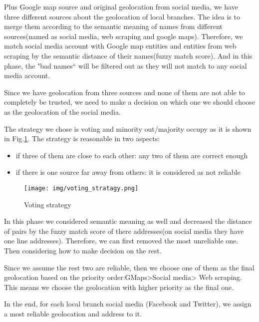 \documentclass[sigchi]{acmart}
\begin{document}
Plus Google map source and original geolocation from social media, we have three different sources about the geolocation of local branches. The idea is to merge them according to the semantic meaning of names from different sources(named as social media, web scraping and google maps). Therefore, we match social media account with Google map entities and entities from web scraping by the semantic distance of their names(fuzzy match score). And in this phase, the "bad names“ will be filtered out as they will not match to any social media account.

Since we have geolocation from three sources and none of them are not able to completely be trusted, we need to make a decision on which one we should choose as the geolocation of the social media.

The strategy we chose is voting and minority out/majority occupy as it is shown in Fig.\ref{fig:Voting_strategy}. The strategy is reasonable in two aspects: 
\begin{itemize}
    \item if three of them are close to each other: any two of them are correct enough
    \item if there is one source far away from others: it is considered as not reliable
\end{itemize}

\begin{figure}
    \texttt{[image: img/voting\_stratagy.png]}
    \caption{Voting strategy}
    \label{fig:Voting_strategy}
\end{figure}

In this phase we considered semantic meaning as well and decreased the distance of pairs by the fuzzy match score of there addresses(on social media they have one line addresses). Therefore, we can first removed the most unreliable one. Then considering how to make decision on the rest.

Since we assume the rest two are reliable, then we choose one of them as the final geolocation based on the priority order:GMaps>Social media> Web scraping. This means we choose the geolocation with higher priority as the final one.

In the end, for each local branch social media (Facebook and Twitter), we assign a most reliable geolocation and address to it.

\end{document}
